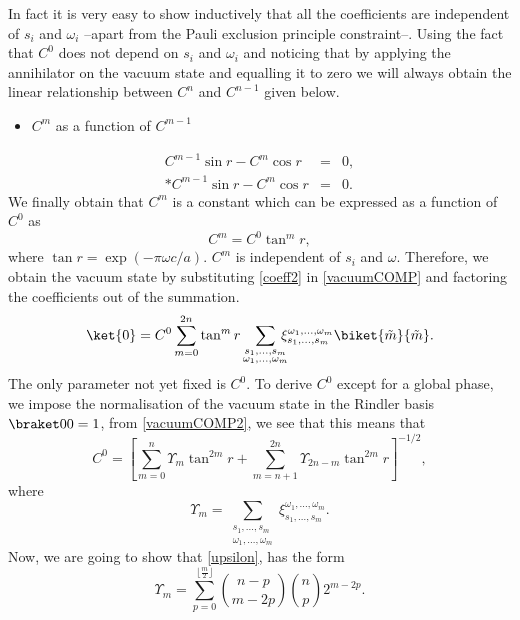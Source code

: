 In fact it is very easy to show inductively that all the coefficients are independent of $s_i$ and $\omega_i$ --apart from the Pauli exclusion principle constraint--. Using the fact that $C^0$ does not depend on $s_i$ and $\omega_i$ and noticing that by applying the annihilator on the vacuum state and equalling it to zero we will always obtain the linear relationship between $C^{n}$ and $C^{n-1}$ given below.
\begin{itemize}
\item $C^m$ as a function of $C^{m-1}$\\[-9mm]
\end{itemize}
\begin{eqnarray}
\label{05}  C^{m-1}\sin r- C^m\cos r&=&0,\\*
\label{06}  C^{m-1}\sin r- C^m\cos r&=&0.
\end{eqnarray}
We finally obtain that $C^m$ is a constant which can be expressed as a function of $C^0$ as
\begin{equation}\label{coeff2}
C^m=C^0 \tan^m r,
\end{equation}
where $\tan r=\exp\left(-\pi \omega c/a\right)$. $C^m$ is independent of $s_i$ and $\omega$. Therefore, we obtain the vacuum state by substituting \eqref{coeff2} in \eqref{vacuumCOMP} and factoring the coefficients out of the summation.
\begin{equation}\label{vacuumCOMP2}
\ket{0}=C^0\sum_{m=0}^{2n}\tan^m r\sum_{\substack{s_1,\dots,s_m\\\omega_1,\dots,\omega_m}}\!\!\!\!\xi_{s_1,\dots,s_m}^{\omega_1,\dots,\omega_m} \biket{\tilde m}{\tilde m}.\\
\end{equation}
The only parameter not yet fixed is $C^0$. To derive $C^0$ except for a global phase, we impose the normalisation of the vacuum state in the Rindler basis $\braket00=1$, from \eqref{vacuumCOMP2}, we see that this means that
\begin{equation}\label{normalispinap}C^0=\left[\sum_{m=0}^n\Upsilon_m\tan^{2m}r+\sum_{m=n+1}^{2n}\Upsilon_{2n-m}\tan^{2m}r\right]^{-1/2},\end{equation}
where
\begin{equation}\label{upsilon}\Upsilon_m=\sum_{\substack{s_1,\dots,s_m\\\omega_1,\dots,\omega_m}}\!\!\!\!\xi_{s_1,\dots,s_m}^{\omega_1,\dots,\omega_m}.
\end{equation}
Now, we are going to show that \eqref{upsilon}, has the form
\begin{equation}\label{upsilonap}\Upsilon_m=\sum_{p=0}^{\lfloor \frac{m}
{2}\rfloor}\binom{n-p}{m-2p}\binom{n}{p}2^{m-2p}.
\end{equation}
